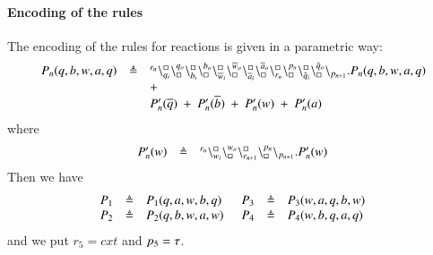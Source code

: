 \paragraph{Encoding of the rules}
The encoding of the rules for reactions is  given in a parametric way:
\[
\begin{array}{lcl}
P_n(q,b,w,a,q) & \triangleq & {}^{r_n}\backslash_{q_i}^{\scriptstyle {\square}}\backslash_{\scriptstyle {\square}}^{q_o}
                                                    \backslash_{b_i}^{\scriptstyle {\square}}\backslash_{\scriptstyle {\square}}^{b_o}
                                                     \backslash_{\overline{w}_i}^{\scriptstyle {\square}}\backslash_{\scriptstyle {\square}}^{\overline{w}_o}
					        \backslash_{\overline{a}_i}^{\scriptstyle {\square}}\backslash_{\scriptstyle {\square}}^{\overline{a}_o}
					        \backslash_{r_n}^{\scriptstyle {\square}}\backslash_{\scriptstyle {\square}}^{p_n}
					        \backslash_{\tilde{q}_i}^{\scriptstyle {\square}}\backslash_{\scriptstyle {\square}}^{\tilde{q}_o}
			\backslash_{p_{n+1}}.P_n(q,b,w,a,q)  \\
			&& +\\
			&&P_n'(\overline{q}) \ +\ P_n'(\overline{b}) \ + \ P_n'(w)\ +\ P_n'(a)\\
			\end{array}
			\]
			\noindent
			where
			\[
\begin{array}{lcl}
P_n'(w) &\triangleq &  {}^{r_n}\backslash_{w_i}^{\scriptstyle {\square}}\backslash_{\scriptstyle {\square}}^{w_o}\backslash_{r_{n+1}}^{\scriptstyle {\square}}\backslash_{\scriptstyle {\square}}^{p_n} \backslash_{p_{n+1}}.P_n'(w) 
\end{array}
\]
\noindent
Then we have 
\[
\begin{array}{lcl @{\hspace{0.5cm}}lcl  }
P_1 & \defeq & P_1(q,a,w,b,q) & P_3 & \defeq & P_3(w,a,q,b,w)  \\
P_2 & \defeq & P_2(q,b,w,a,w) &P_4 & \defeq & P_4(w,b,q,a,q) 
\end{array}
\]
\noindent
and we put 
$r_5 = cxt$ and  $p_5 = \tau$.


